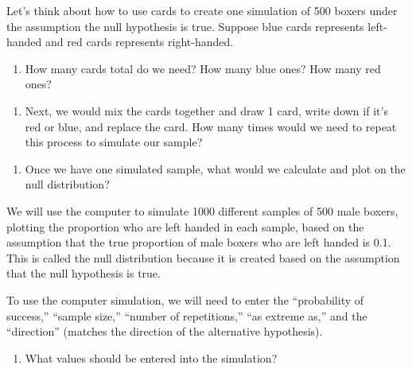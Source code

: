 \documentclass[
]{report}
\providecommand{\tightlist}{%
  \setlength{\itemsep}{0pt}\setlength{\parskip}{0pt}}
\begin{document}
Let's think about how to use cards to create one simulation of 500 boxers under the assumption the null hypothesis is true. Suppose blue cards represents left-handed and red cards represents right-handed.

\begin{enumerate}
\def\labelenumi{\arabic{enumi}.}
\setcounter{enumi}{14}
\tightlist
\item
  How many cards total do we need? How many blue ones? How many red ones?
\end{enumerate}

\vspace{0.5in}

\begin{enumerate}
\def\labelenumi{\arabic{enumi}.}
\setcounter{enumi}{15}
\tightlist
\item
  Next, we would mix the cards together and draw 1 card, write down if it's red or blue, and replace the card. How many times would we need to repeat this process to simulate our sample?
\end{enumerate}

\vspace{0.5in}

\begin{enumerate}
\def\labelenumi{\arabic{enumi}.}
\setcounter{enumi}{16}
\tightlist
\item
  Once we have one simulated sample, what would we calculate and plot on the null distribution?
  \vspace{1in}
\end{enumerate}

We will use the computer to simulate 1000 different samples of 500 male boxers, plotting the proportion who are left handed in each sample, based on the assumption that the true proportion of male boxers who are left handed is 0.1. This is called the null distribution because it is created based on the assumption that the null hypothesis is true.

To use the computer simulation, we will need to enter the ``probability of success,'' ``sample size,'' ``number of repetitions,'' ``as extreme as,'' and the ``direction'' (matches the direction of the alternative hypothesis).

\begin{enumerate}
\def\labelenumi{\arabic{enumi}.}
\setcounter{enumi}{17}
\tightlist
\item
  What values should be entered into the simulation?
\end{enumerate}
\end{document}
